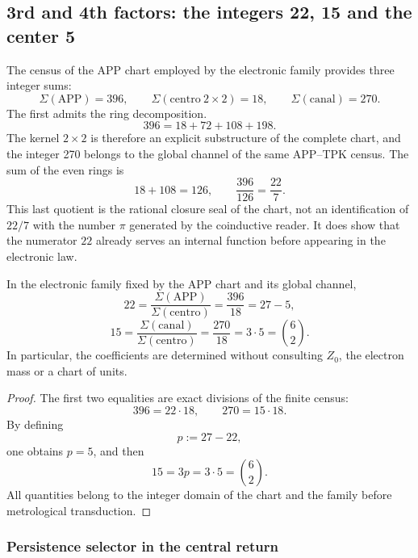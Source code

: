 \subsection{3rd and 4th factors: the integers 22, 15 and the center 5}

The census of the APP chart employed by the electronic family provides
three integer sums:
\[
 \Sigma(\mathrm{APP})=396,
 \qquad
 \Sigma(\mathrm{centro}\ 2\times2)=18,
 \qquad
 \Sigma(\mathrm{canal})=270.
\]
The first admits the ring decomposition.
\[
 396=18+72+108+198.
\]
The kernel \(2\times2\) is therefore an explicit substructure of the
complete chart, and the integer 270 belongs to the global channel of the same
APP--TPK census.
The sum of the even rings is
\[
 18+108=126,
 \qquad
 \frac{396}{126}=\frac{22}{7}.
\]
This last quotient is the rational closure seal of the chart, not an
identification of \(22/7\) with the number \(\pi\) generated by the coinductive
reader. It does show that the numerator \(22\) already serves an
internal function before appearing in the electronic law.

\begin{theorem}
\label{p12-83-c15-s2:thm:coeficientes-electron-rev6}
In the electronic family fixed by the APP chart and its global channel,
\[
 \boxed{
 22=\frac{\Sigma(\mathrm{APP})}
 {\Sigma(\mathrm{centro})}
 =\frac{396}{18}=27-5,}
\]
\[
 \boxed{
 15=\frac{\Sigma(\mathrm{canal})}
 {\Sigma(\mathrm{centro})}
 =\frac{270}{18}=3\cdot5=\binom62.}
\]
In particular, the coefficients are determined without consulting
\(Z_0\), the electron mass or a chart of units.
\end{theorem}

\begin{proof}
The first two equalities are exact divisions of the finite census:
\[
 396=22\cdot18,
 \qquad
 270=15\cdot18.
\]
By defining
\[
 p:=27-22,
\]
one obtains \(p=5\), and then
\[
 15=3p=3\cdot5=\binom62.
\]
All quantities belong to the integer domain of the chart and the
family before metrological transduction.
\end{proof}

\subsubsection{Persistence selector in the central return}

